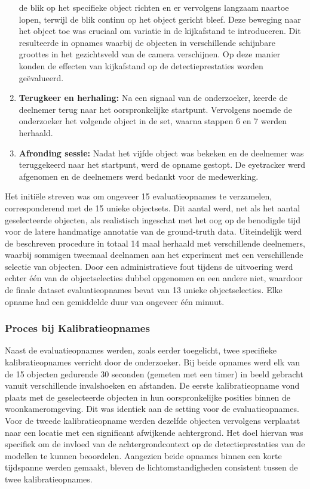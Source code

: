 \begin{enumerate}
  de blik op het specifieke object richten en er vervolgens langzaam naartoe lopen, 
  terwijl de blik continu op het object gericht bleef. 
  Deze beweging naar het object toe was cruciaal om variatie in de kijkafstand te introduceren.
  Dit resulteerde in opnames waarbij de objecten in verschillende schijnbare groottes in het gezichtsveld van de camera verschijnen. 
  Op deze manier konden de effecten van kijkafstand op de detectieprestaties worden geëvalueerd.
  \item \textbf{Terugkeer en herhaling:} Na een signaal van de onderzoeker, keerde de deelnemer terug naar het oorspronkelijke startpunt. 
  Vervolgens noemde de onderzoeker het volgende object in de set, waarna stappen 6 en 7 werden herhaald.
  \item \textbf{Afronding sessie:} Nadat het vijfde object was bekeken en de deelnemer was teruggekeerd naar het startpunt, 
  werd de opname gestopt. De eyetracker werd afgenomen en de deelnemers werd bedankt voor de medewerking.
\end{enumerate}

Het initiële streven was om ongeveer 15 evaluatieopnames te verzamelen, corresponderend met de 15 unieke objectsets. 
Dit aantal werd, net als het aantal geselecteerde objecten, als realistisch ingeschat met het oog op de benodigde tijd voor de 
latere handmatige annotatie van de ground-truth data. 
Uiteindelijk werd de beschreven procedure in totaal 14 maal herhaald met verschillende deelnemers, 
waarbij sommigen tweemaal deelnamen aan het experiment met een verschillende selectie van objecten. 
Door een administratieve fout tijdens de uitvoering werd echter één van de objectselecties dubbel opgenomen en een andere niet, 
waardoor de finale dataset evaluatieopnames bevat van 13 unieke objectselecties. 
Elke opname had een gemiddelde duur van ongeveer één minuut.

\subsubsection{Proces bij Kalibratieopnames}
\label{sec:kalibratieopnames}

Naast de evaluatieopnames werden, zoals eerder toegelicht, twee specifieke kalibratieopnames verricht door de onderzoeker.
Bij beide opnames werd elk van de 15 objecten gedurende 30 seconden (gemeten met een timer) in beeld gebracht vanuit verschillende invalshoeken en afstanden.
De eerste kalibratieopname vond plaats met de geselecteerde objecten in hun oorspronkelijke posities binnen de woonkameromgeving.
Dit was identiek aan de setting voor de evaluatieopnames. 
Voor de tweede kalibratieopname werden dezelfde objecten vervolgens verplaatst naar een locatie met een significant afwijkende achtergrond. 
Het doel hiervan was specifiek om de invloed van de achtergrondcontext op de detectieprestaties van de modellen te kunnen beoordelen.
Aangezien beide opnames binnen een korte tijdspanne werden gemaakt, bleven de lichtomstandigheden consistent tussen de twee kalibratieopnames.